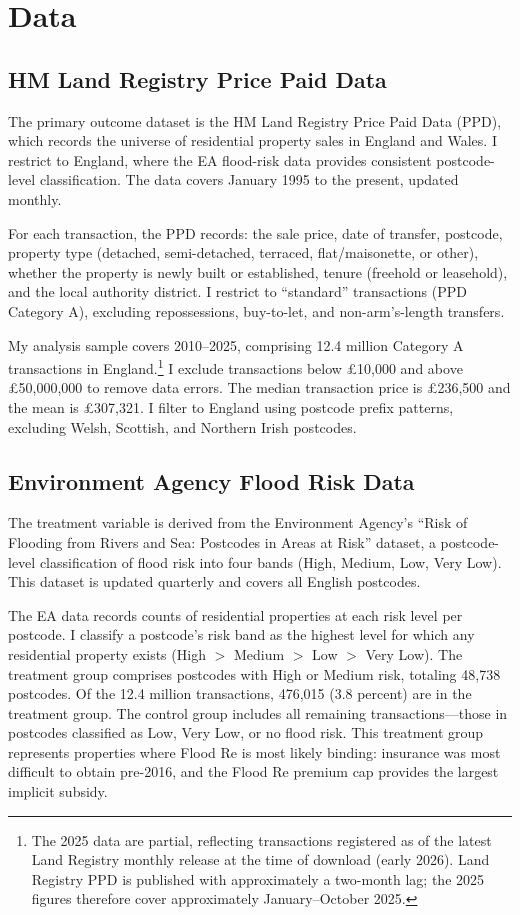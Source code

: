 \documentclass[12pt]{article}
\begin{document}
\section{Data} \label{sec:data}

\subsection{HM Land Registry Price Paid Data}

The primary outcome dataset is the HM Land Registry Price Paid Data (PPD), which records the universe of residential property sales in England and Wales. I restrict to England, where the EA flood-risk data provides consistent postcode-level classification. The data covers January 1995 to the present, updated monthly.

For each transaction, the PPD records: the sale price, date of transfer, postcode, property type (detached, semi-detached, terraced, flat/maisonette, or other), whether the property is newly built or established, tenure (freehold or leasehold), and the local authority district. I restrict to ``standard'' transactions (PPD Category A), excluding repossessions, buy-to-let, and non-arm's-length transfers.

My analysis sample covers 2010--2025, comprising 12.4 million Category A transactions in England.\footnote{The 2025 data are partial, reflecting transactions registered as of the latest Land Registry monthly release at the time of download (early 2026). Land Registry PPD is published with approximately a two-month lag; the 2025 figures therefore cover approximately January--October 2025.} I exclude transactions below \pounds10,000 and above \pounds50,000,000 to remove data errors. The median transaction price is \pounds236,500 and the mean is \pounds307,321. I filter to England using postcode prefix patterns, excluding Welsh, Scottish, and Northern Irish postcodes.

\subsection{Environment Agency Flood Risk Data}

The treatment variable is derived from the Environment Agency's ``Risk of Flooding from Rivers and Sea: Postcodes in Areas at Risk'' dataset, a postcode-level classification of flood risk into four bands (High, Medium, Low, Very Low). This dataset is updated quarterly and covers all English postcodes.

The EA data records counts of residential properties at each risk level per postcode. I classify a postcode's risk band as the highest level for which any residential property exists (High $>$ Medium $>$ Low $>$ Very Low). The treatment group comprises postcodes with High or Medium risk, totaling 48,738 postcodes. Of the 12.4 million transactions, 476,015 (3.8 percent) are in the treatment group. The control group includes all remaining transactions---those in postcodes classified as Low, Very Low, or no flood risk. This treatment group represents properties where Flood Re is most likely binding: insurance was most difficult to obtain pre-2016, and the Flood Re premium cap provides the largest implicit subsidy.
\end{document}
